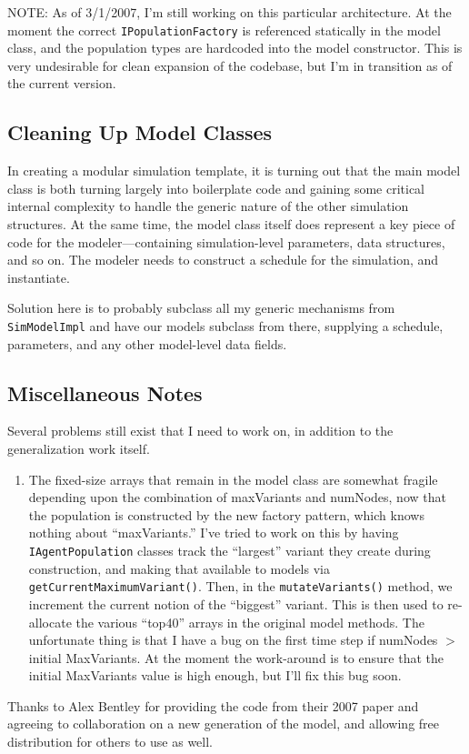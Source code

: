 \documentclass[noid]{kluwer-mem-proposal}
\begin{document}
\begin{article}
 NOTE:  As of 3/1/2007, I'm still working on this particular architecture.  At
 the moment the correct \texttt{IPopulationFactory} is referenced statically in
 the model class, and the population types are hardcoded into the model
 constructor.  This is very undesirable for clean expansion of the codebase, but
 I'm in transition as of the current version.  

\subsection{Cleaning Up Model Classes}
In creating a modular simulation template, it is turning out that the main model
class is both turning largely into boilerplate code and gaining some critical
internal complexity to handle the generic nature of the other simulation
structures.  At the same time, the model class itself does represent a key piece
of code for the modeler---containing simulation-level parameters, data
structures, and so on.  The modeler needs to construct a schedule for the
simulation, and instantiate.  

Solution here is to probably subclass all my generic mechanisms from
\texttt{SimModelImpl} and have our models subclass from there, supplying a
schedule, parameters, and any other model-level data fields.

\subsection{Miscellaneous Notes}
Several problems still exist that I need to work on, in addition to the
generalization work itself.  
\begin{enumerate}
  \item The fixed-size arrays that remain in the model class are somewhat
  fragile depending upon the combination of maxVariants and numNodes, now that
  the population is constructed by the new factory pattern, which knows nothing
  about ``maxVariants.''  I've tried to work on this by having
  \texttt{IAgentPopulation} classes track the ``largest'' variant they create
  during construction, and making that available to models via
  \texttt{getCurrentMaximumVariant()}.  Then, in the \texttt{mutateVariants()} 
  method, we increment the current notion of the ``biggest'' variant.  This is
  then used to re-allocate the various ``top40'' arrays in the original model
  methods.  The unfortunate thing is that I have a bug on the first time step if
  numNodes \( > \) initial MaxVariants.  At the moment the work-around is to
  ensure
  that the initial MaxVariants value is high enough, but I'll fix this bug soon.
\end{enumerate}

\acknowledgements
Thanks to Alex Bentley for providing the code from their 2007 paper and agreeing
to collaboration on a new generation of the model, and allowing free
distribution for others to use as well.  
\end{article}
\end{document}
